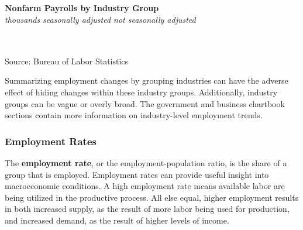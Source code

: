 \documentclass{report}
\newcommand{\tbllink}[1]{\href{https://raw.githubusercontent.com/bdecon/US-chartbook/master/chartbook/data/#1}{\faTable}}
\begin{document}
{\begin{minipage}{0.76\textwidth}

\end{minipage}
\vspace{2mm}

\begin{minipage}{0.86\textwidth}
\normalsize \textbf{Nonfarm Payrolls by Industry Group}\\
\footnotesize{\textit{thousands \hspace{38mm}seasonally adjusted \hspace{30mm} not seasonally adjusted}}\\
\vspace{-5mm}

\hspace*{-3mm} \noindent {} \setlength{\tabcolsep}{4.2pt} \color{black!90}
		{\renewcommand{\arraystretch}{1.55}
		 \begin{tabular}{p{44mm} R{12.8mm} R{11.0mm} R{11.0mm} R{11.0mm} 
		   | R{12.8mm} R{11.0mm}}
			  \hline
		\end{tabular}
		}	\\
		
\vspace{-2mm}
\footnotesize{Source: Bureau of Labor Statistics} \hfill \tbllink{ces_data.csv}
\end{minipage}
\vspace{3mm}

\begin{minipage}{0.76\textwidth}
\small Summarizing employment changes by grouping industries can have the adverse effect of hiding changes within these industry groups. Additionally, industry groups can be vague or overly broad. The government and business chartbook sections contain more information on industry-level employment trends. 
\end{minipage}
\newpage
\vspace*{-6mm}
\begin{minipage}{0.76\textwidth} 
\subsubsection*{Employment Rates} 
\vspace{-0.5mm}
\small The \textbf{employment rate}, or the employment-population ratio, is the share of a group that is employed. Employment rates can provide useful insight into macroeconomic conditions. A high employment rate means available labor are being utilized in the productive process. All else equal, higher employment results in both increased supply, as the result of more labor being used for production, and increased demand, as the result of higher levels of income.


\end{minipage}}
\end{document}
